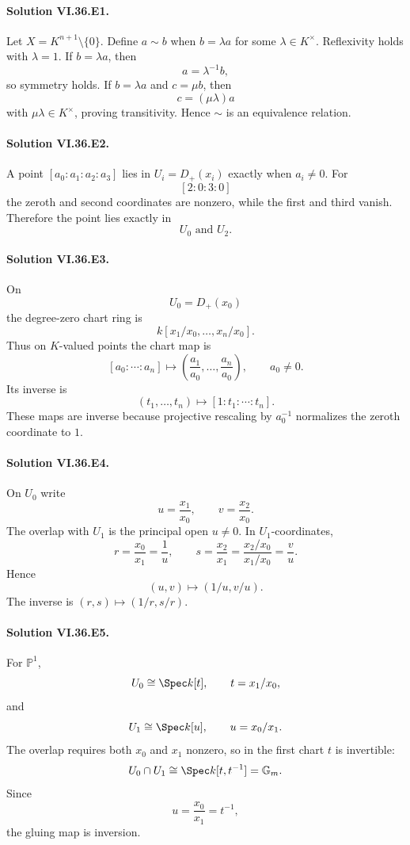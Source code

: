 
\paragraph{Solution VI.36.E1.}
Let \(X=K^{n+1}\setminus\{0\}\). Define \(a\sim b\) when \(b=\lambda a\) for some
\(\lambda\in K^\times\). Reflexivity holds with \(\lambda=1\). If \(b=\lambda a\), then
\[
a=\lambda^{-1}b,
\]
so symmetry holds. If \(b=\lambda a\) and \(c=\mu b\), then
\[
c=(\mu\lambda)a
\]
with \(\mu\lambda\in K^\times\), proving transitivity. Hence \(\sim\) is an equivalence relation.

\paragraph{Solution VI.36.E2.}
A point \([a_0:a_1:a_2:a_3]\) lies in \(U_i=D_+(x_i)\) exactly when \(a_i\neq0\). For
\[
[2:0:3:0]
\]
the zeroth and second coordinates are nonzero, while the first and third vanish. Therefore the point lies exactly in
\[
\boxed{U_0\text{ and }U_2}.
\]

\paragraph{Solution VI.36.E3.}
On
\[
U_0=D_+(x_0)
\]
the degree-zero chart ring is
\[
k[x_1/x_0,\ldots,x_n/x_0].
\]
Thus on \(K\)-valued points the chart map is
\[
[a_0:\cdots:a_n]
\longmapsto
\left(\frac{a_1}{a_0},\ldots,\frac{a_n}{a_0}\right),
\qquad a_0\neq0.
\]
Its inverse is
\[
(t_1,\ldots,t_n)\longmapsto[1:t_1:\cdots:t_n].
\]
These maps are inverse because projective rescaling by \(a_0^{-1}\) normalizes the zeroth coordinate to \(1\).

\paragraph{Solution VI.36.E4.}
On \(U_0\) write
\[
u=\frac{x_1}{x_0},
\qquad
v=\frac{x_2}{x_0}.
\]
The overlap with \(U_1\) is the principal open \(u\neq0\). In \(U_1\)-coordinates,
\[
r=\frac{x_0}{x_1}=\frac1u,
\qquad
s=\frac{x_2}{x_1}
=\frac{x_2/x_0}{x_1/x_0}
=\frac vu.
\]
Hence
\[
\boxed{(u,v)\longmapsto(1/u,v/u)}.
\]
The inverse is \((r,s)\mapsto(1/r,s/r)\).

\paragraph{Solution VI.36.E5.}
For \(\mathbb P^1\),
\[
U_0\cong\Spec k[t],
\qquad
t=x_1/x_0,
\]
and
\[
U_1\cong\Spec k[u],
\qquad
u=x_0/x_1.
\]
The overlap requires both \(x_0\) and \(x_1\) nonzero, so in the first chart \(t\) is invertible:
\[
U_0\cap U_1\cong\Spec k[t,t^{-1}]=\mathbb G_m.
\]
Since
\[
u=\frac{x_0}{x_1}=t^{-1},
\]
the gluing map is inversion.

